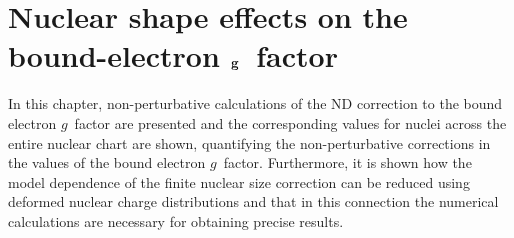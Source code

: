 \chapter{Nuclear shape effects on the bound-electron $\bf{g}$~factor}
\label{ch:nucl_def}

In this chapter, non-perturbative calculations of the ND correction to the bound electron $g$~factor are presented and the corresponding values for nuclei across the entire nuclear chart are shown, quantifying the non-perturbative corrections in the values of the bound electron $g$~factor. Furthermore, it is shown how the model dependence of the finite nuclear size correction can be reduced using deformed nuclear charge distributions and that in this connection the numerical calculations are necessary for obtaining precise results.

